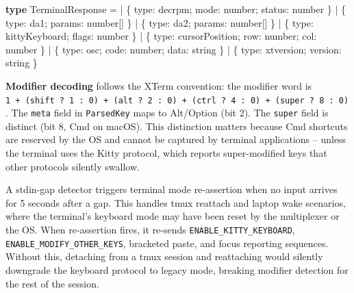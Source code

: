 \documentclass[
  english,
  11pt,
  letterpaper,
]{book}
\newenvironment{Shaded}{\begin{snugshade}}{\end{snugshade}}
\newcommand{\DataTypeTok}[1]{\textcolor[rgb]{0.68,0.00,0.00}{#1}}
\newcommand{\KeywordTok}[1]{\textcolor[rgb]{0.00,0.23,0.31}{\textbf{#1}}}
\newcommand{\NormalTok}[1]{\textcolor[rgb]{0.00,0.23,0.31}{#1}}
\newcommand{\OperatorTok}[1]{\textcolor[rgb]{0.37,0.37,0.37}{#1}}
\newcommand{\StringTok}[1]{\textcolor[rgb]{0.13,0.47,0.30}{#1}}
\begin{document}
\begin{Shaded}
\begin{Highlighting}[]
\KeywordTok{type}\NormalTok{ TerminalResponse }\OperatorTok{=}
  \OperatorTok{|}\NormalTok{ \{ type}\OperatorTok{:} \StringTok{\textquotesingle{}decrpm\textquotesingle{}}\OperatorTok{;}\NormalTok{ mode}\OperatorTok{:} \DataTypeTok{number}\OperatorTok{;}\NormalTok{ status}\OperatorTok{:} \DataTypeTok{number}\NormalTok{ \}}
  \OperatorTok{|}\NormalTok{ \{ type}\OperatorTok{:} \StringTok{\textquotesingle{}da1\textquotesingle{}}\OperatorTok{;}\NormalTok{ params}\OperatorTok{:} \DataTypeTok{number}\NormalTok{[] \}}
  \OperatorTok{|}\NormalTok{ \{ type}\OperatorTok{:} \StringTok{\textquotesingle{}da2\textquotesingle{}}\OperatorTok{;}\NormalTok{ params}\OperatorTok{:} \DataTypeTok{number}\NormalTok{[] \}}
  \OperatorTok{|}\NormalTok{ \{ type}\OperatorTok{:} \StringTok{\textquotesingle{}kittyKeyboard\textquotesingle{}}\OperatorTok{;}\NormalTok{ flags}\OperatorTok{:} \DataTypeTok{number}\NormalTok{ \}}
  \OperatorTok{|}\NormalTok{ \{ type}\OperatorTok{:} \StringTok{\textquotesingle{}cursorPosition\textquotesingle{}}\OperatorTok{;}\NormalTok{ row}\OperatorTok{:} \DataTypeTok{number}\OperatorTok{;}\NormalTok{ col}\OperatorTok{:} \DataTypeTok{number}\NormalTok{ \}}
  \OperatorTok{|}\NormalTok{ \{ type}\OperatorTok{:} \StringTok{\textquotesingle{}osc\textquotesingle{}}\OperatorTok{;}\NormalTok{ code}\OperatorTok{:} \DataTypeTok{number}\OperatorTok{;}\NormalTok{ data}\OperatorTok{:} \DataTypeTok{string}\NormalTok{ \}}
  \OperatorTok{|}\NormalTok{ \{ type}\OperatorTok{:} \StringTok{\textquotesingle{}xtversion\textquotesingle{}}\OperatorTok{;}\NormalTok{ version}\OperatorTok{:} \DataTypeTok{string}\NormalTok{ \}}
\end{Highlighting}
\end{Shaded}

\textbf{Modifier decoding} follows the XTerm convention: the modifier
word is
\texttt{1\ +\ (shift\ ?\ 1\ :\ 0)\ +\ (alt\ ?\ 2\ :\ 0)\ +\ (ctrl\ ?\ 4\ :\ 0)\ +\ (super\ ?\ 8\ :\ 0)}.
The \texttt{meta} field in \texttt{ParsedKey} maps to Alt/Option (bit
2). The \texttt{super} field is distinct (bit 8, Cmd on macOS). This
distinction matters because Cmd shortcuts are reserved by the OS and
cannot be captured by terminal applications -- unless the terminal uses
the Kitty protocol, which reports super-modified keys that other
protocols silently swallow.

A stdin-gap detector triggers terminal mode re-assertion when no input
arrives for 5 seconds after a gap. This handles tmux reattach and laptop
wake scenarios, where the terminal's keyboard mode may have been reset
by the multiplexer or the OS. When re-assertion fires, it re-sends
\texttt{ENABLE\_KITTY\_KEYBOARD}, \texttt{ENABLE\_MODIFY\_OTHER\_KEYS},
bracketed paste, and focus reporting sequences. Without this, detaching
from a tmux session and reattaching would silently downgrade the
keyboard protocol to legacy mode, breaking modifier detection for the
rest of the session.
\end{document}
